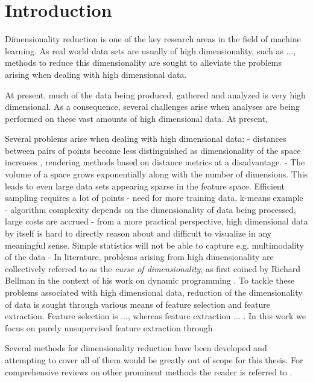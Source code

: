 \chapter{Introduction}
\label{ch:introduction}

Dimensionality reduction is one of the key research areas in the field of machine learning. As real world data sets are usually of high dimensionality, such as ..., methods to reduce this dimensionality are sought to alleviate the problems arising when dealing with high dimensional data. 

At present, much of the data being produced, gathered and analyzed is very high dimensional. As a consequence, several challenges arise when analyses are being performed on these vast amounts of high dimensional data.
At present, 

Several problems arise when dealing with high dimensional data:
- distances between pairs of points become less distinguished as dimensionality of the space increases \cite{on_the_surprising_behavior_of_distance_metrics}, rendering methods based on distance metrics at a disadvantage.
- The volume of a space grows exponentially along with the number of dimensions. This leads to even large data sets appearing sparse in the feature space. Efficient sampling requires a lot of points
- need for more training data, k-means example \cite[p.~263]{understanding_machine_learning}
- algorithm complexity depends on the dimensionality of data being processed, large costs are accrued
- from a more practical perspective, high dimensional data by itself is hard to directly reason about and difficult to visualize in any meaningful sense. Simple statistics will not be able to capture e.g. multimodality of the data
- In literature, problems arising from high dimensionality are collectively referred to as the \textit{curse of dimensionality}, as first coined by Richard Bellman in the context of his work on dynamic programming \cite{bellman_curse_of_dimensionality}.
To tackle these problems associated with high dimensional data, reduction of the dimensionality of data is sought through various means of feature selection and feature extraction. Feature selection is ..., whereas feature extraction ... . In this work we focus on purely unsupervised feature extraction through 

Several methods for dimensionality reduction have been developed and attempting to cover all of them would be greatly out of scope for this thesis. For comprehensive reviews on other prominent methods the reader is referred to \cite{first_dimensionality_reduction_review, second_dimensionality_reduction_review}.


